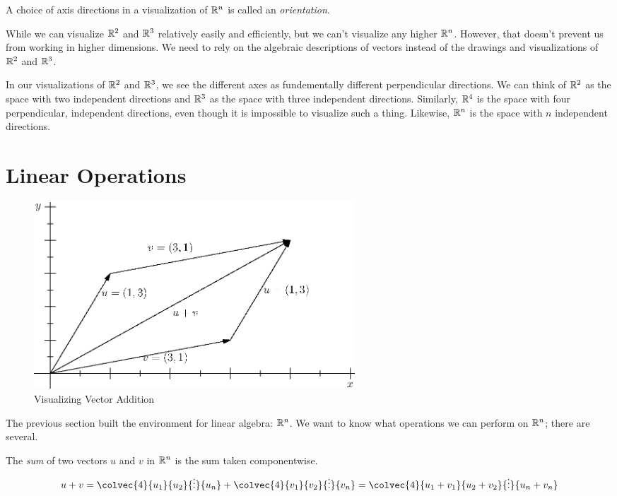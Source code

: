 \documentclass[fleqn,letterpaper]{report}
\begin{document}
\begin{defn}
A choice of axis directions in a visualization of $\mathbb{R}^n$ 
is called an \emph{orientation}.
\end{defn}

While we can visualize $\mathbb{R}^2$ and $\mathbb{R}^3$ relatively easily and
efficiently, but we can't visualize any higher $\mathbb{R}^n$. However,
that doesn't prevent us from working in higher dimensions. We need to
rely on the algebraic descriptions of vectors instead of the
drawings and visualizations of $\mathbb{R}^2$ and $\mathbb{R}^3$. 

In our visualizations of $\mathbb{R}^2$ and
$\mathbb{R}^3$, we see the different axes as fundementally
different perpendicular directions. We can think of $\mathbb{R}^2$ as
the space with two independent directions and $\mathbb{R}^3$ as the
space with three independent directions. Similarly, $\mathbb{R}^4$ is
the space with four perpendicular, independent directions, even
though it is impossible to visualize such a thing. 
Likewise, $\mathbb{R}^n$ is the space with $n$ independent directions. 

\section{Linear Operations}
\label{linear-operations}

\begin{figure}[t]
\centering
\includegraphics[width=12cm]{figure04.eps}
\caption{Visualizing Vector Addition}
\label{figure-vector-addition}
\end{figure}

The previous section built the environment for linear
algebra: $\mathbb{R}^n$.  We want to know what operations we can
perform on $\mathbb{R}^n$; there are several.

\begin{defn}
The \emph{sum} of two vectors $u$ and $v$ in $\mathbb{R}^n$ is the
sum taken componentwise.
\begin{equation*}
u + v = \colvec{4}{u_1}{u_2}{\vdots}{u_n} +
\colvec{4}{v_1}{v_2}{\vdots}{v_n} = \colvec{4}{u_1 + v_1}{u_2
+ v_2}{\vdots}{u_n + v_n}
\end{equation*}
\end{defn}
\end{document}
